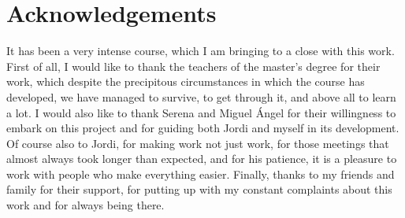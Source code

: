 \chapter*{Acknowledgements}\label{ch:Agradecimientos}
It has been a very intense course, which I am bringing to a close with this work. First of all, I would like to thank the teachers of the master's degree for their work, 
which despite the precipitous circumstances in which the course has developed, we have managed to survive, to get through it, and above all to learn a lot. I would also 
like to thank Serena and Miguel Ángel for their willingness to embark on this project and for guiding both Jordi and myself in its development. Of course also to Jordi, 
for making work not just work, for those meetings that almost always took longer than expected, and for his patience, it is a pleasure to work with people who make everything easier. 
Finally, thanks to my friends and family for their support, for putting up with my constant complaints about this work and for always being there.
